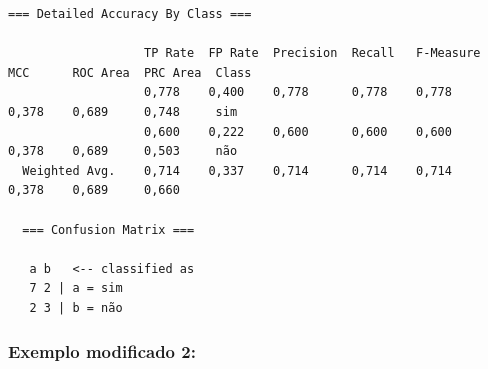 \documentclass[
    article,            %
    11pt,               %
    oneside,            %
    a4paper,            %
    english,            %
    brazil,             %
    sumario=tradicional,
    ]{abntex2}
\begin{document}
\begin{itemize}
\begin{Verbatim}[frame=single, fontsize=\tiny]
  === Detailed Accuracy By Class ===

                   TP Rate  FP Rate  Precision  Recall   F-Measure  MCC      ROC Area  PRC Area  Class
                   0,778    0,400    0,778      0,778    0,778      0,378    0,689     0,748     sim
                   0,600    0,222    0,600      0,600    0,600      0,378    0,689     0,503     não
  Weighted Avg.    0,714    0,337    0,714      0,714    0,714      0,378    0,689     0,660     

  === Confusion Matrix ===

   a b   <-- classified as
   7 2 | a = sim
   2 3 | b = não
   \end{Verbatim}
\end{itemize}


\subsubsection{\textbf{Exemplo modificado 2:}}
\end{document}

